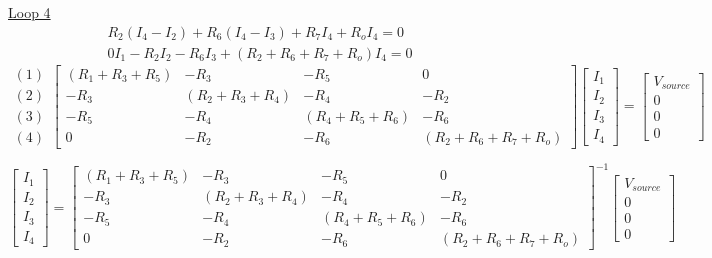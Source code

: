 \documentclass[12pt]{article}
\begin{document}
\underline{Loop 4}
\begin{equation}
    \begin{gathered}
        R_2(I_4-I_2) + R_6(I_4-I_3) + R_7I_4 + R_oI_4 = 0 \\
        0I_1 - R_2I_2 - R_6I_3 + (R_2 + R_6 + R_7 + R_o)I_4 = 0
    \end{gathered}
\end{equation}
\restoregeometry
\clearpage
\[
\begin{matrix}
    (1) \\
    (2) \\
    (3) \\
    (4)    
\end{matrix}
\begin{bmatrix}
    (R_1 + R_3 + R_5) & -R_3 & -R_5 & 0 \\
    -R_3 & (R_2 + R_3 + R_4) & -R_4 & -R_2 \\
    -R_5 & -R_4 & (R_4 + R_5 + R_6) & -R_6 \\
    0 & -R_2 & -R_6 & (R_2 + R_6 + R_7 + R_o)
\end{bmatrix}
\begin{bmatrix}
    I_1 \\
    I_2 \\
    I_3 \\
    I_4
\end{bmatrix}
=
\begin{bmatrix}
    V_{source} \\
    0 \\
    0 \\
    0
\end{bmatrix}
\]

\[
\begin{bmatrix}
    I_1 \\
    I_2 \\
    I_3 \\
    I_4
\end{bmatrix}
=
\begin{bmatrix}
    (R_1 + R_3 + R_5) & -R_3 & -R_5 & 0 \\
    -R_3 & (R_2 + R_3 + R_4) & -R_4 & -R_2 \\
    -R_5 & -R_4 & (R_4 + R_5 + R_6) & -R_6 \\
    0 & -R_2 & -R_6 & (R_2 + R_6 + R_7 + R_o)
\end{bmatrix} ^{-1}
\begin{bmatrix}
    V_{source} \\
    0 \\
    0 \\
    0
\end{bmatrix}
\]
\end{document}
